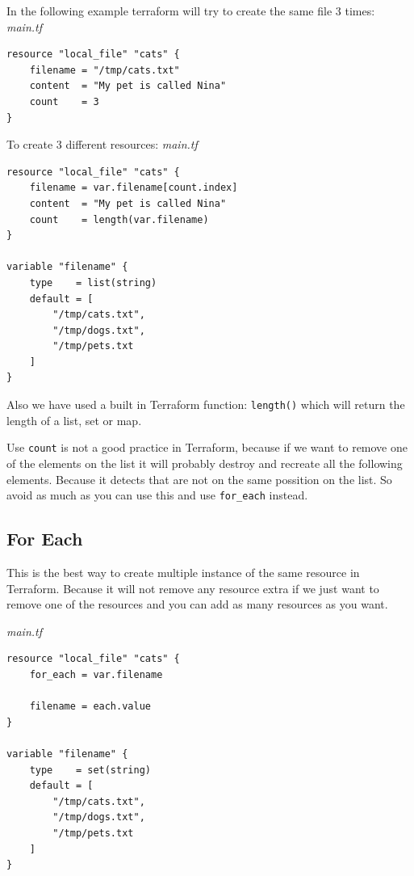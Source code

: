 \documentclass{article}
\newenvironment{blocktemplateII}[1]{%
    \tcolorbox[beamer,%
    noparskip,breakable,
    colframe=Green,%
    colbacklower=LimeGreen!75!LightGreen,%
    title=#1]}%
    {\endtcolorbox}
\newenvironment{blocktemplateIII}[1]{%
    \tcolorbox[beamer,%
    noparskip,breakable,
    ,colframe=Red,%
    colbacklower=LimeGreen!75!LightGreen,%
    title=#1]}%
    {\endtcolorbox}
\newenvironment{codetemplate}[1][]{%
  \mybasecolorbox[#1]
  \itshape
}{%
  \endmybasecolorbox
}
\begin{document}
In the following example terraform will try to create the same file 3 times:
\begin{codetemplate}{main.tf}
\begin{verbatim}
resource "local_file" "cats" {
    filename = "/tmp/cats.txt"
    content  = "My pet is called Nina"
    count    = 3
}
\end{verbatim}
\end{codetemplate}

To create 3 different resources:
\begin{codetemplate}{main.tf}
\begin{verbatim}
resource "local_file" "cats" {
    filename = var.filename[count.index]
    content  = "My pet is called Nina"
    count    = length(var.filename)
}

variable "filename" {
    type    = list(string)
    default = [
        "/tmp/cats.txt",
        "/tmp/dogs.txt",
        "/tmp/pets.txt
    ]
}
\end{verbatim}
\end{codetemplate}

\begin{blocktemplateII}{Note}
Also we have used a built in Terraform function: \verb+length()+ which will return the length of a list, set or map.
\end{blocktemplateII}

\begin{blocktemplateIII}{WARNING}
Use \verb+count+ is not a good practice in Terraform, because if we want to remove one of the elements on the list it will probably destroy and recreate all the following elements. Because it detects that are not on the same possition on the list. So avoid as much as you can use this and use \verb+for_each+ instead.
\end{blocktemplateIII}

\subsection{For Each}
This is the best way to create multiple instance of the same resource in Terraform. Because it will not remove any resource extra if we just want to remove one of the resources and you can add as many resources as you want.

\begin{codetemplate}{main.tf}
\begin{verbatim}
resource "local_file" "cats" {
    for_each = var.filename    

    filename = each.value
}

variable "filename" {
    type    = set(string)
    default = [
        "/tmp/cats.txt",
        "/tmp/dogs.txt",
        "/tmp/pets.txt
    ]
}
\end{verbatim}
\end{codetemplate}
\end{document}
